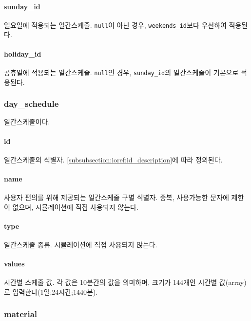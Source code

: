 \paragraph{sunday\_id} 일요일에 적용되는 일간스케줄. \texttt{null}이 아닌 경우, \texttt{weekends\_id}보다 우선하여 적용된다.

\paragraph{holiday\_id} 공휴일에 적용되는 일간스케줄. \texttt{null}인 경우, \texttt{sunday\_id}의 일간스케줄이 기본으로 적용된다.

\subsubsection{day\_schedule} \label{subsubsection:ioref:dayschedule}
일간스케줄이다.

\paragraph{id} 일간스케줄의 식별자. \ref{subsubsection:ioref:id_description}에 따라 정의된다.

\paragraph{name} 사용자 편의를 위해 제공되는 일간스케줄 구별 식별자. 중복, 사용가능한 문자에 제한이 없으며, 시뮬레이션에 직접 사용되지 않는다.

\paragraph{type} 일간스케줄 종류. 시뮬레이션에 직접 사용되지 않는다.

\paragraph{values} 시간별 스케줄 값. 각 값은 10분간의 값을 의미하며, 크기가 144개인 시간별 값(array)로 입력한다(1일;24시간;1440분).

\subsubsection{material} \label{subsubsection:ioref:material}


